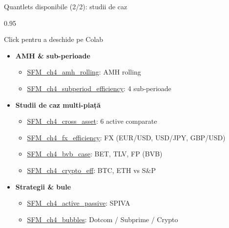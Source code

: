 \documentclass[9pt, aspectratio=169, t]{beamer}
\begin{document}
\begin{frame}[shrink=15]{Quantlets disponibile (2/2): studii de caz}
\begin{cminipage}{0.95\textwidth}
\begin{block}{Click pentru a deschide pe Colab}
\footnotesize
\begin{itemize}\setlength{\itemsep}{0pt}
    \item \textbf{AMH \& sub-perioade}
    \begin{itemize}\setlength{\itemsep}{0pt}
        \item \href{https://colab.research.google.com/github/QuantLet/Stat_fin_markets/blob/master/Ch_04/SFM_ch4_amh_rolling/SFM_ch4_amh_rolling.ipynb}{SFM\_ch4\_amh\_rolling}: AMH rolling
        \item \href{https://colab.research.google.com/github/QuantLet/Stat_fin_markets/blob/master/Ch_04/SFM_ch4_subperiod_efficiency/SFM_ch4_subperiod_efficiency.ipynb}{SFM\_ch4\_subperiod\_efficiency}: 4 sub-perioade
    \end{itemize}
    \item \textbf{Studii de caz multi-piață}
    \begin{itemize}\setlength{\itemsep}{0pt}
        \item \href{https://colab.research.google.com/github/QuantLet/Stat_fin_markets/blob/master/Ch_04/SFM_ch4_cross_asset/SFM_ch4_cross_asset.ipynb}{SFM\_ch4\_cross\_asset}: 6 active comparate
        \item \href{https://colab.research.google.com/github/QuantLet/Stat_fin_markets/blob/master/Ch_04/SFM_ch4_fx_efficiency/SFM_ch4_fx_efficiency.ipynb}{SFM\_ch4\_fx\_efficiency}: FX (EUR/USD, USD/JPY, GBP/USD)
        \item \href{https://colab.research.google.com/github/QuantLet/Stat_fin_markets/blob/master/Ch_04/SFM_ch4_bvb_case/SFM_ch4_bvb_case.ipynb}{SFM\_ch4\_bvb\_case}: BET, TLV, FP (BVB)
        \item \href{https://colab.research.google.com/github/QuantLet/Stat_fin_markets/blob/master/Ch_04/SFM_ch4_crypto_eff/SFM_ch4_crypto_eff.ipynb}{SFM\_ch4\_crypto\_eff}: BTC, ETH vs S\&P
    \end{itemize}
    \item \textbf{Strategii \& bule}
    \begin{itemize}\setlength{\itemsep}{0pt}
        \item \href{https://colab.research.google.com/github/QuantLet/Stat_fin_markets/blob/master/Ch_04/SFM_ch4_active_passive/SFM_ch4_active_passive.ipynb}{SFM\_ch4\_active\_passive}: SPIVA
        \item \href{https://colab.research.google.com/github/QuantLet/Stat_fin_markets/blob/master/Ch_04/SFM_ch4_bubbles/SFM_ch4_bubbles.ipynb}{SFM\_ch4\_bubbles}: Dotcom / Subprime / Crypto
    \end{itemize}
\end{itemize}
\end{block}
\end{cminipage}
\end{frame}
\end{document}
